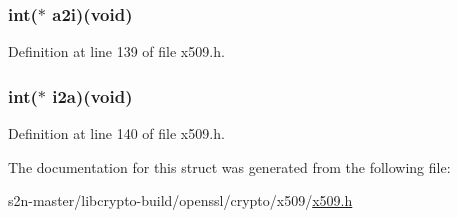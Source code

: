 \subsubsection[{\texorpdfstring{a2i}{a2i}}]{\setlength{\rightskip}{0pt plus 5cm}int($\ast$ a2i)({\bf void})}\hypertarget{struct_x509__objects__st_af5b00905fbb0c26534ca56edd836db28}{}\label{struct_x509__objects__st_af5b00905fbb0c26534ca56edd836db28}


Definition at line 139 of file x509.\+h.

\subsubsection[{\texorpdfstring{i2a}{i2a}}]{\setlength{\rightskip}{0pt plus 5cm}int($\ast$ i2a)({\bf void})}\hypertarget{struct_x509__objects__st_a259abb086fee469632375e311a8628cb}{}\label{struct_x509__objects__st_a259abb086fee469632375e311a8628cb}


Definition at line 140 of file x509.\+h.



The documentation for this struct was generated from the following file\+:\begin{DoxyCompactItemize}
\item 
s2n-\/master/libcrypto-\/build/openssl/crypto/x509/\hyperlink{crypto_2x509_2x509_8h}{x509.\+h}\end{DoxyCompactItemize}
